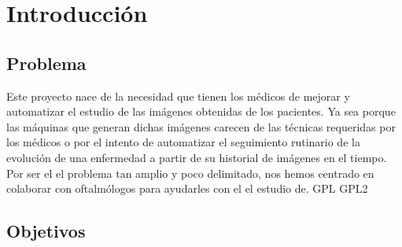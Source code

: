 \chapter{Introducción}
\section{Problema}
Este proyecto nace de la necesidad que tienen los médicos de mejorar y
automatizar el estudio de las imágenes obtenidas de los pacientes. Ya
sea porque las máquinas que generan dichas imágenes carecen de las
técnicas requeridas por los médicos o por el intento de automatizar el
seguimiento rutinario de la evolución de una enfermedad a partir de su
historial de imágenes en el tiempo. \\
Por ser el el problema tan amplio y poco delimitado, nos hemos centrado en colaborar con oftalmólogos para ayudarles con el el estudio de.
\ac{GPL}
\gls{GPL2}
\section{Objetivos}
